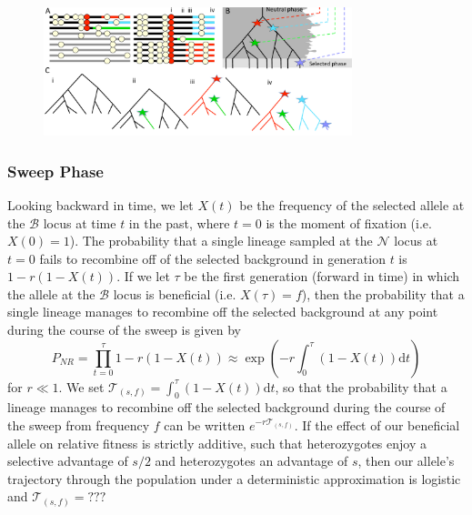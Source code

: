 \documentclass[a4paper,10pt]{article}
\newcommand{\fancyN}{$\mathcal N$ }
\newcommand{\fancyB}{$\mathcal B$ }
\begin{document}
\begin{figure}
	\includegraphics[width = 0.8\textwidth]{../Paper_Figures/Cartoon_of_soft_sweeps.pdf}
\end{figure}


\subsubsection{Sweep Phase}
Looking backward in time, we let $X\left(t\right)$ be the frequency of the selected allele at the \fancyB locus at time $t$ in the past, where $t=0$ is the moment of fixation (i.e. $X\left(0\right) = 1$). The probability that a single lineage sampled at the \fancyN locus at $t=0$ fails to recombine off of the selected background in generation $t$ is $1-r\left(1-X(t)\right)$. If we let $\tau$ be the first generation (forward in time) in which the allele at the \fancyB locus is beneficial (i.e. $X\left(\tau\right) = f$), then the probability that a single lineage manages to recombine off the selected background at any point during the course of the sweep is given by
\begin{equation}
P_{NR} = \prod_{t=0}^{\tau} 1-r\left(1-X(t)\right)  \approx \exp \left(-r \int_0^{\tau}(1-X\left(t\right))\mathrm{d} t \right)
\end{equation}
for $r \ll 1$. We set  $\mathcal{T}_{\left(s,f\right)} = \int_0^{\tau}(1-X\left(t\right))\mathrm{d}t$, so that the probability that a lineage manages to recombine off the selected background during the course of the sweep from frequency $f$ can be written $e^{-r\mathcal{T}_{\left(s,f\right)}}$. If the effect of our beneficial allele on relative fitness is strictly additive, such that heterozygotes enjoy a selective advantage of $s/2$ and heterozygotes an advantage of $s$, then our allele's trajectory through the population under a deterministic approximation is logistic and $\mathcal{T}_{\left(s,f\right)} = ???$
\end{document}
